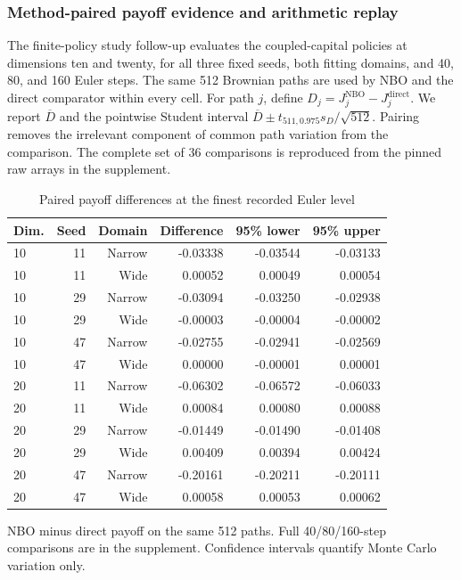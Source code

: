 \subsubsection{Method-paired payoff evidence and arithmetic replay}\label{sec:r8-coverage}
The finite-policy study follow-up evaluates the coupled-capital policies at dimensions ten and twenty, for all three fixed seeds, both fitting domains, and 40, 80, and 160 Euler steps. The same 512 Brownian paths are used by NBO and the direct comparator within every cell. For path $j$, define $D_j=J_j^{\mathrm{NBO}}-J_j^{\mathrm{direct}}$. We report $\overline D$ and the pointwise Student interval $\overline D\pm t_{511,0.975}s_D/\sqrt{512}$. Pairing removes the irrelevant component of common path variation from the comparison. The complete set of 36 comparisons is reproduced from the pinned raw arrays in the supplement.

\begin{table}[htbp]\centering
\caption{Paired payoff differences at the finest recorded Euler level}
\begin{small}\begin{tabular}{lrrrrr}
\toprule
Dim. & Seed & Domain & Difference & 95\% lower & 95\% upper \\
\midrule
10 & 11 & Narrow & -0.03338 & -0.03544 & -0.03133 \\
10 & 11 & Wide & 0.00052 & 0.00049 & 0.00054 \\
10 & 29 & Narrow & -0.03094 & -0.03250 & -0.02938 \\
10 & 29 & Wide & -0.00003 & -0.00004 & -0.00002 \\
10 & 47 & Narrow & -0.02755 & -0.02941 & -0.02569 \\
10 & 47 & Wide & 0.00000 & -0.00001 & 0.00001 \\
20 & 11 & Narrow & -0.06302 & -0.06572 & -0.06033 \\
20 & 11 & Wide & 0.00084 & 0.00080 & 0.00088 \\
20 & 29 & Narrow & -0.01449 & -0.01490 & -0.01408 \\
20 & 29 & Wide & 0.00409 & 0.00394 & 0.00424 \\
20 & 47 & Narrow & -0.20161 & -0.20211 & -0.20111 \\
20 & 47 & Wide & 0.00058 & 0.00053 & 0.00062 \\
\bottomrule\end{tabular}\end{small}
\par\smallskip\begin{minipage}{0.96\linewidth}\footnotesize NBO minus direct payoff on the same 512 paths. Full 40/80/160-step comparisons are in the supplement. Confidence intervals quantify Monte Carlo variation only.\end{minipage}
\end{table}


